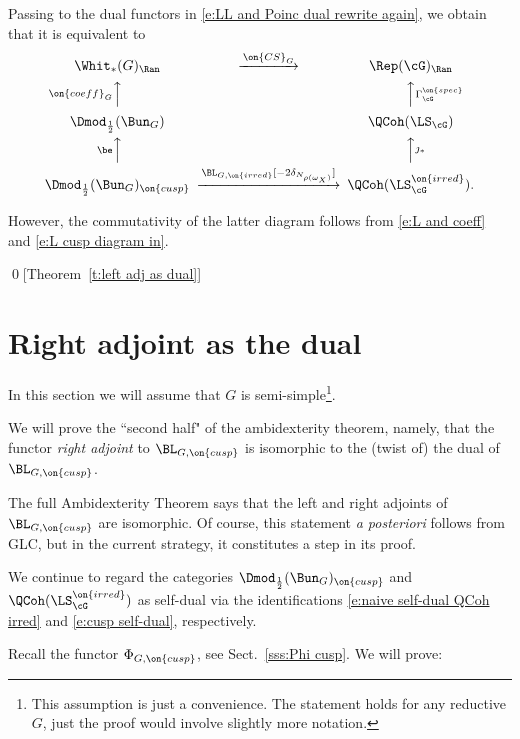 \documentclass[9pt]{amsart}
\theoremstyle{remark}
\theoremstyle{definition}
\theoremstyle{remark}
\newcommand{\thmref}[1]{Theorem~\ref{#1}}
\newcommand{\secref}[1]{Sect.~\ref{#1}}
\numberwithin{equation}{section}
\begin{document}
\sssec{}

Passing to the dual functors in \eqref{e:LL and Poinc dual rewrite again}, we obtain that it is equivalent to
$$
\CD
\Whit_*(G)_\Ran @>{\on{CS}_G}>>  \Rep(\cG)_\Ran \\
@A{\on{coeff}_G}AA @AA{\Gamma^{\on{spec}}_\cG}A \\
\Dmod_{\frac{1}{2}}(\Bun_G)  & & \QCoh(\LS_\cG) \\
@A{\be}AA @AA{\jmath_*}A  \\
\Dmod_{\frac{1}{2}}(\Bun_G)_{\on{cusp}} @>{\BL_{G,\on{irred}}[-2\delta_{N_{\rho(\omega_X)}}]}>> \QCoh(\LS^{\on{irred}}_\cG).
\endCD
$$

However, the commutativity of the latter diagram follows from \eqref{e:L and coeff} and \eqref{e:L cusp diagram in}. 

\qed[\thmref{t:left adj as dual}]


\section{Right adjoint as the dual} \label{s:right}

In this section we will assume that $G$ is semi-simple\footnote{This assumption is just a convenience. The statement holds 
for any reductive $G$, just the proof would involve slightly more notation.}.

\medskip

We will prove the ``second half" of the ambidexterity theorem, namely, that the functor \emph{right adjoint} to $\BL_{G,\on{cusp}}$
is isomorphic to the (twist of) the dual of $\BL_{G,\on{cusp}}$. 

\medskip

The full Ambidexterity Theorem says that the left and right adjoints of $\BL_{G,\on{cusp}}$ are isomorphic. Of course, this statement 
\emph{a posteriori} follows from GLC, but in the current strategy, it constitutes a step in its proof. 


\sssec{}

We continue to regard the categories $\Dmod_{\frac{1}{2}}(\Bun_G)_{\on{cusp}}$ and $\QCoh(\LS^{\on{irred}}_\cG)$ as self-dual
via the identifications \eqref{e:naive self-dual QCoh irred} and \eqref{e:cusp self-dual}, respectively.  

\medskip

Recall the functor $\Phi_{G,\on{cusp}}$, see \secref{sss:Phi cusp}. We will prove:
\end{document}
